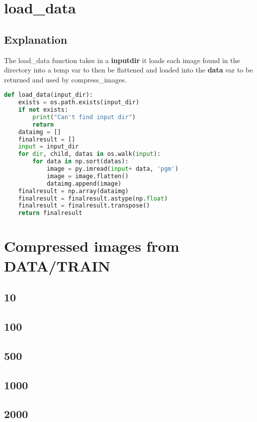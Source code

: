 \documentclass{article}
\begin{document}
\section{load\_data}
\subsection{Explanation}
The load\_data function takes in a \textbf{inputdir} it loads each image found in the directory into a temp var to then be flattened and loaded into the \textbf{data} var to be returned and used by compress\_images.

\begin{lstlisting}[language=Python]
def load_data(input_dir):
    exists = os.path.exists(input_dir)
    if not exists:
        print("Can't find input dir")
        return 
    dataimg = []
    finalresult = []
    input = input_dir
    for dir, child, datas in os.walk(input):
        for data in np.sort(datas):
            image = py.imread(input+ data, 'pgm')
            image = image.flatten()
            dataimg.append(image)
    finalresult = np.array(dataimg)
    finalresult = finalresult.astype(np.float)
    finalresult = finalresult.transpose()
    return finalresult
\end{lstlisting}

\section{Compressed images from DATA/TRAIN}
\subsection{10}
\subsection{100}
\subsection{500}
\subsection{1000}
\subsection{2000}




\end{document}
